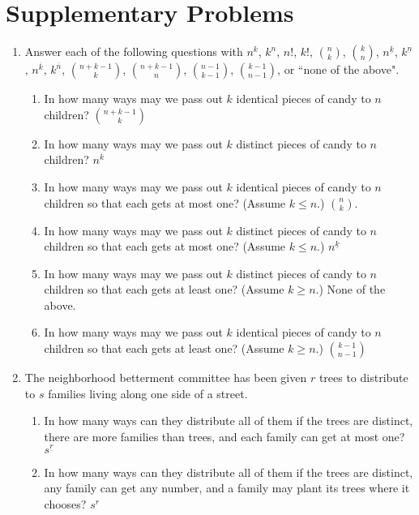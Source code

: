 \documentclass[10pt,]{book}
\theoremstyle{plain}
\theoremstyle{definition}
\numberwithin{equation}{chapter}
\begin{document}
\section[{Supplementary Problems}]{Supplementary Problems}\label{section-11}
\leavevmode%
\begin{enumerate}
\item\hypertarget{li-47}{}Answer each of the following questions with \(n^k\), \(k^n\), \(n!\), \(k!\), \(n \choose k\), \(k \choose n\), \(n^{\underline{k}}\), \(k^{\underline{n}}\), \(n^{\overline{k}}\), \(k^{\overline{n}}\), \(n+k-1\choose k\), \(n+k-1\choose n\), \(n-1\choose k-1\), \(k-1\choose n-1\), or ``none of the above". %
\begin{enumerate}
\item\hypertarget{li-48}{}In how many ways may we pass out \(k\) identical pieces of candy to \(n\) children? \(n+k-1\choose k\)%
%
\item\hypertarget{li-49}{}In how many ways may we pass out \(k\) distinct pieces of candy to \(n\) children? \(n^k\)%
%
\item\hypertarget{li-50}{}In how many ways may we pass out \(k\) identical pieces of candy to \(n\) children so that each gets at most one?  (Assume \(k\le n\).) \(n\choose k\).%
%
\item\hypertarget{li-51}{}In how many ways may we pass out \(k\) distinct pieces of candy to \(n\) children so that each gets at most one?  (Assume \(k\le n\).) \(n^{\underline{k}}\)%
%
\item\hypertarget{li-52}{}In how many ways may we pass out \(k\) distinct pieces of candy to \(n\) children so that each gets at least one?  (Assume \(k\ge n\).) None of the above.%
%
\item\hypertarget{li-53}{}In how many ways may we pass out \(k\) identical pieces of candy to \(n\) children so that each gets at least one?  (Assume \(k\ge n\).) \(k-1\choose n-1\)%
%
\end{enumerate}
%
\item\hypertarget{li-54}{}The neighborhood betterment committee has been given \(r\) trees to distribute to \(s\) families living along one side of a street. %
\begin{enumerate}
\item\hypertarget{li-55}{}In how many ways can they distribute all of them if the trees are distinct, there are more families than trees, and each family can get at most one? \(s^{\underline{r}}\)%
%
\item\hypertarget{li-56}{}In how many ways can they distribute all of them if the trees are distinct, any family can get any number, and a family may plant its trees where it chooses? \(s^r\)%

\end{enumerate}
\end{enumerate}
\end{document}
